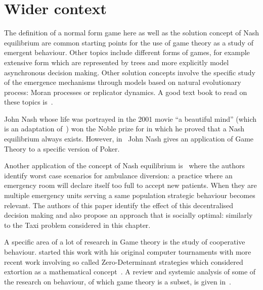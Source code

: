 \section{Wider context}\label{sec:game_theory_wider_context}

The definition of a normal form game here as well as the solution concept of
Nash equilibrium are common starting points for the use of game theory as a
study of emergent behaviour. Other topics include different forms of games, for
example extensive form which are represented by trees and more explicitly model
asynchronous decision making. Other solution concepts involve the specific study
of the emergence mechanisms through models based on natural evolutionary
process: Moran processes or replicator dynamics. A good text book to read on
these topics is~\parencite{maschler2013game}.

John Nash whose life was portrayed in the 2001 movie ``a beautiful mind'' (which
is an adaptation of~\parencite{nasar2011beautiful}) won the Noble prize
for\parencite{nash1950equilibrium} in which he proved that a Nash equilibrium
always exists. However, in~\parencite{nash1951non} John Nash gives an
application of Game Theory to a specific version of Poker.

Another application of the concept of Nash equilibrium
is~\parencite{deo2011centralized} where the authors identify worst case
scenarios for ambulance diversion: a practice where an emergency room will
declare itself too full to accept new patients. When they are multiple emergency
units serving a same population strategic behaviour becomes relevant. The
authors of this paper identify the effect of this decentralised decision making
and also propose an approach that is socially optimal: similarly to the Taxi
problem considered in this chapter.

A specific area of a lot of research in Game theory is the study of cooperative
behaviour. \parencite{axelrod1981evolution} started this work with his original
computer tournaments with more recent work involving so called Zero-Determinant
strategies which considered extortion as a mathematical
concept~\parencite{press2012iterated}.
A review and systemic analysis of some of the research on behaviour, of which
game theory is a subset,
is given in~\parencite{press2012iterated}.
